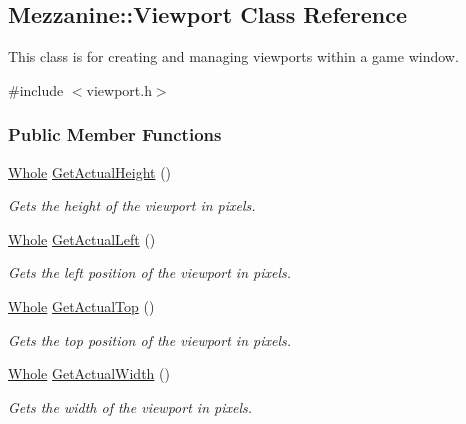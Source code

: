\hypertarget{classMezzanine_1_1Viewport}{
\subsection{Mezzanine::Viewport Class Reference}
\label{classMezzanine_1_1Viewport}
}


This class is for creating and managing viewports within a game window.  




{\ttfamily \#include $<$viewport.h$>$}

\subsubsection*{Public Member Functions}
\begin{DoxyCompactItemize}
\item 
\hyperlink{namespaceMezzanine_adcbb6ce6d1eb4379d109e51171e2e493}{Whole} \hyperlink{classMezzanine_1_1Viewport_ab76a92f62936a525509c12672e42203a}{GetActualHeight} ()
\begin{DoxyCompactList}\small\item\em Gets the height of the viewport in pixels. \item\end{DoxyCompactList}\item 
\hyperlink{namespaceMezzanine_adcbb6ce6d1eb4379d109e51171e2e493}{Whole} \hyperlink{classMezzanine_1_1Viewport_a22de6c59dd33f1d26cfc732bbc20eb42}{GetActualLeft} ()
\begin{DoxyCompactList}\small\item\em Gets the left position of the viewport in pixels. \item\end{DoxyCompactList}\item 
\hyperlink{namespaceMezzanine_adcbb6ce6d1eb4379d109e51171e2e493}{Whole} \hyperlink{classMezzanine_1_1Viewport_a844f8438ce4f1046656416246ff68e87}{GetActualTop} ()
\begin{DoxyCompactList}\small\item\em Gets the top position of the viewport in pixels. \item\end{DoxyCompactList}\item 
\hyperlink{namespaceMezzanine_adcbb6ce6d1eb4379d109e51171e2e493}{Whole} \hyperlink{classMezzanine_1_1Viewport_a033b546e1fc35f5835262c270a7d8a94}{GetActualWidth} ()
\begin{DoxyCompactList}\small\item\em Gets the width of the viewport in pixels. \item\end{DoxyCompactList}\item 

\end{DoxyCompactItemize}
